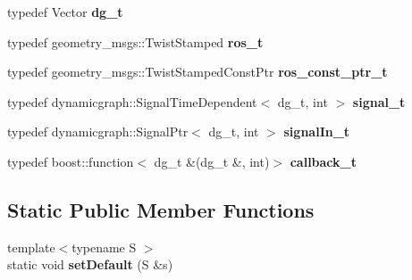 \begin{DoxyCompactItemize}
\item 
\mbox{\label{structdynamic__graph_1_1DgToRos_3_01std_1_1pair_3_01specific_1_1Twist_00_01Vector_01_4_01_4_a80b80b734370545e924de0c4a4fc6344}} 
typedef Vector {\bfseries dg\+\_\+t}
\item 
\mbox{\label{structdynamic__graph_1_1DgToRos_3_01std_1_1pair_3_01specific_1_1Twist_00_01Vector_01_4_01_4_ac9b2e43797e8c009550fe8f95a9db68a}} 
typedef geometry\+\_\+msgs\+::\+Twist\+Stamped {\bfseries ros\+\_\+t}
\item 
\mbox{\label{structdynamic__graph_1_1DgToRos_3_01std_1_1pair_3_01specific_1_1Twist_00_01Vector_01_4_01_4_aa986fbbab5468dc4a0af75faf8cf0ed5}} 
typedef geometry\+\_\+msgs\+::\+Twist\+Stamped\+Const\+Ptr {\bfseries ros\+\_\+const\+\_\+ptr\+\_\+t}
\item 
\mbox{\label{structdynamic__graph_1_1DgToRos_3_01std_1_1pair_3_01specific_1_1Twist_00_01Vector_01_4_01_4_afb690fd1c16d8bcf4d22afe860df2172}} 
typedef dynamicgraph\+::\+Signal\+Time\+Dependent$<$ dg\+\_\+t, int $>$ {\bfseries signal\+\_\+t}
\item 
\mbox{\label{structdynamic__graph_1_1DgToRos_3_01std_1_1pair_3_01specific_1_1Twist_00_01Vector_01_4_01_4_a67d5bb920e5cc0eeab87680d4f43413f}} 
typedef dynamicgraph\+::\+Signal\+Ptr$<$ dg\+\_\+t, int $>$ {\bfseries signal\+In\+\_\+t}
\item 
\mbox{\label{structdynamic__graph_1_1DgToRos_3_01std_1_1pair_3_01specific_1_1Twist_00_01Vector_01_4_01_4_af488e134f275e43816900a3b88642cc0}} 
typedef boost\+::function$<$ dg\+\_\+t \&(dg\+\_\+t \&, int)$>$ {\bfseries callback\+\_\+t}
\end{DoxyCompactItemize}
\subsection*{Static Public Member Functions}
\begin{DoxyCompactItemize}
\item 
\mbox{\label{structdynamic__graph_1_1DgToRos_3_01std_1_1pair_3_01specific_1_1Twist_00_01Vector_01_4_01_4_a472fe0ce8d37349252baf012cd7f9dca}} 
{\footnotesize template$<$typename S $>$ }\\static void {\bfseries set\+Default} (S \&s)
\end{DoxyCompactItemize}
